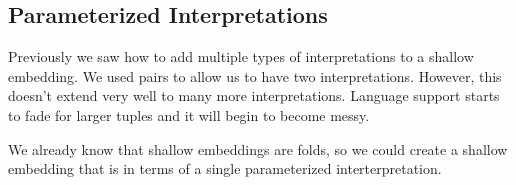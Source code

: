 \documentclass[a4paper, twocolumn, 10pt]{extarticle}
\newcommand{\Conid}[1]{\mathit{#1}}
\newcommand{\Varid}[1]{\mathit{#1}}
\newcommand{\plus}{\mathbin{+\!\!\!+}}
\def\resethooks{%
  \global\let\SaveRestoreHook\empty
  \global\let\ColumnHook\empty}
\newlength{\blanklineskip}
\newcommand{\hsindent}[1]{\quad}%
\newcommand*\hscompose[2]{#1}
\newcommand\hslambda{\global\let\hsarrow=\hsarrowperiodonce}
\newcommand*\hsarrowperiodonce[2]{#2\global\let\hsarrow=\hscompose}
\begin{document}
\resethooks

\subsection{Parameterized Interpretations}

Previously we saw how to add multiple types of interpretations to a shallow embedding. We used pairs to allow us to have two interpretations.
However, this doesn't extend very well to many more interpretations. Language support starts to fade for larger tuples and it will begin to become messy.

We already know that shallow embeddings are folds, so we could create a shallow embedding that is in terms of a single parameterized interterpretation.
\end{document}
